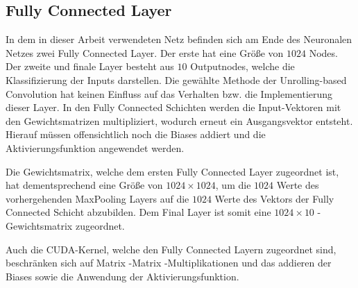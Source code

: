 \documentclass[../main.tex]{subfiles}
\begin{document}
\subsection{Fully Connected Layer} \label{sec:cuda_fully}
In dem in dieser Arbeit verwendeten Netz befinden sich am Ende des Neuronalen Netzes zwei Fully Connected Layer. Der erste hat eine Größe von $1024$ Nodes. Der zweite und finale Layer besteht aus $10$ Outputnodes, welche die Klassifizierung der Inputs darstellen. Die gewählte Methode der Unrolling-based Convolution hat keinen Einfluss auf das Verhalten bzw. die Implementierung dieser Layer. In den Fully Connected Schichten werden die Input-Vektoren mit den Gewichtsmatrizen multipliziert, wodurch erneut ein Ausgangsvektor entsteht. Hierauf müssen offensichtlich noch die Biases addiert und die Aktivierungsfunktion angewendet werden. \par Die Gewichtsmatrix, welche dem ersten Fully Connected Layer zugeordnet ist, hat dementsprechend eine Größe von $
1024\times1024$, um die $1024$ Werte des vorhergehenden MaxPooling Layers auf die $1024$ Werte des Vektors der Fully Connected Schicht abzubilden. Dem Final Layer ist somit eine $1024\times10$ -Gewichtsmatrix zugeordnet. \par 
Auch die CUDA-Kernel, welche den Fully Connected Layern zugeordnet sind, beschränken sich auf Matrix -Matrix -Multiplikationen und das addieren der Biases sowie die Anwendung der Aktivierungsfunktion. \par 
\end{document}
